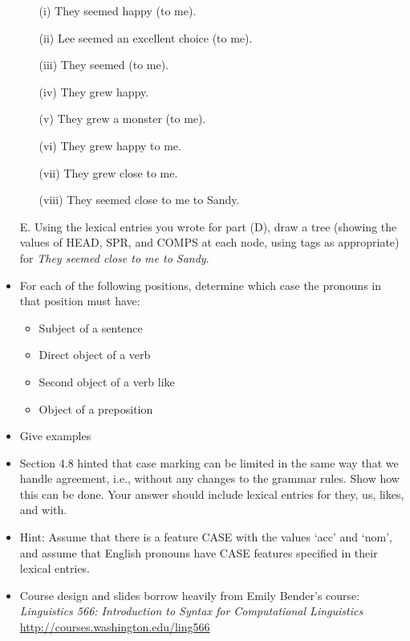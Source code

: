 \documentclass[a4paper,landscape,headrule,footrule]{foils}
\begin{document}
\begin{itemize}
   \begin{itemize}
   \item[(i)] They seemed happy (to me).
   \item[(ii)] Lee seemed an excellent choice (to me).
   \item[(iii)] \bad They seemed (to me).
   \item[(iv)] They grew happy.
   \item[(v)] \bad They grew a monster (to me).
   \item[(vi)] \bad They grew happy to me.
   \item[(vii)] They grew close to me.
   \item[(viii)] They seemed close to me to Sandy.
   \end{itemize}

\newpage
\item[E.] Using the lexical entries you wrote for part (D), draw
a tree (showing the values of HEAD, SPR, and COMPS at each node,
using tags as appropriate) for {\it They seemed close to me to Sandy}.

\end{itemize}



\begin{itemize}
\item For each of the following positions,
determine which case the pronouns in that
position must have:
\begin{itemize}
\item Subject of a sentence
\item Direct object of a verb
\item Second object of a verb like 
\item Object of a preposition
\end{itemize}
\item Give examples
\end{itemize}

\begin{itemize}
\item Section 4.8 hinted that case marking can be
limited in the same way that we handle
agreement, i.e., without any changes to the
grammar rules. Show how this can be done.
Your answer should include lexical entries
for they, us, likes, and with.
\item Hint: Assume that there is a feature CASE
with the values ‘acc’ and ‘nom’, and assume
that English pronouns have CASE features
specified in their lexical entries.
\end{itemize}


\begin{itemize}
\item Course design and slides borrow heavily from Emily Bender's course:
\textit{Linguistics 566: Introduction to Syntax for Computational Linguistics}
\\ \url{http://courses.washington.edu/ling566}
\end{itemize}
\end{document}

